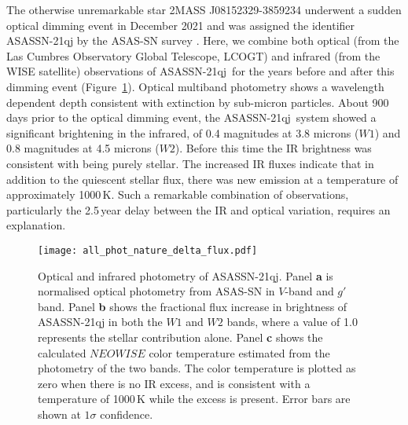 \documentclass[sn-nature]{sn-jnl}%
\newcommand{\asas}{ASASSN-21qj}
\begin{document}




The otherwise unremarkable star 2MASS J08152329-3859234 underwent a sudden optical dimming event in December 2021 \cite{RizzoSmith21,RizzoSmith22} and was assigned the identifier \asas{} by the ASAS-SN survey \citep{shappee_man_2014,kochanek_all-sky_2017}.
%
Here, we combine both optical (from the Las Cumbres Observatory Global Telescope, LCOGT) and infrared (from the WISE satellite) observations of \asas~for the years before and after this dimming event (Figure~\ref{fig:wisephot}). 
%
Optical multiband photometry shows a wavelength dependent depth consistent with extinction by sub-micron particles.
%
About 900 days prior to the optical dimming event, the \asas~system showed a significant brightening in the infrared, of 0.4 magnitudes at 3.8 microns ($W1$) and 0.8 magnitudes at 4.5 microns ($W2$).
%
Before this time the IR brightness was consistent with being purely stellar.
%
The increased IR fluxes indicate that in addition to the quiescent stellar flux, there was new emission at a temperature of approximately 1000\,K.
%
Such a remarkable combination of observations, particularly the 2.5\,year delay between the IR and optical variation, requires an explanation.

\begin{figure}
\begin{centering}
\texttt{[image: all\_phot\_nature\_delta\_flux.pdf]}
\caption{Optical and infrared photometry of ASASSN-21qj.
%
Panel {\bf a} is normalised optical photometry from ASAS-SN in $V$-band and $g'$ band.
%
Panel {\bf b} shows the fractional flux increase in brightness of ASASSN-21qj in both the $W1$ and $W2$ bands, where a value of 1.0 represents the stellar contribution alone.
%
Panel {\bf c} shows the calculated $NEOWISE$ color temperature estimated from the photometry of the two bands.
%
The color temperature is plotted as zero when there is no IR excess, and is consistent with a temperature of 1000\,K while the excess is present.
%
Error bars are shown at $1\sigma$ confidence.
}
\label{fig:wisephot}
\end{centering}
\end{figure}


\end{document}
